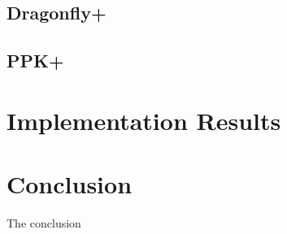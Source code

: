 \documentclass{amsart}
\theoremstyle{remark}
\begin{document}
\subsection{Dragonfly+}


\subsection{PPK+}



\section{Implementation Results}
\label{sec:Implementation}



\section{Conclusion}
\label{sec:Conclusion}
The conclusion




\nocite{*}


\end{document}
